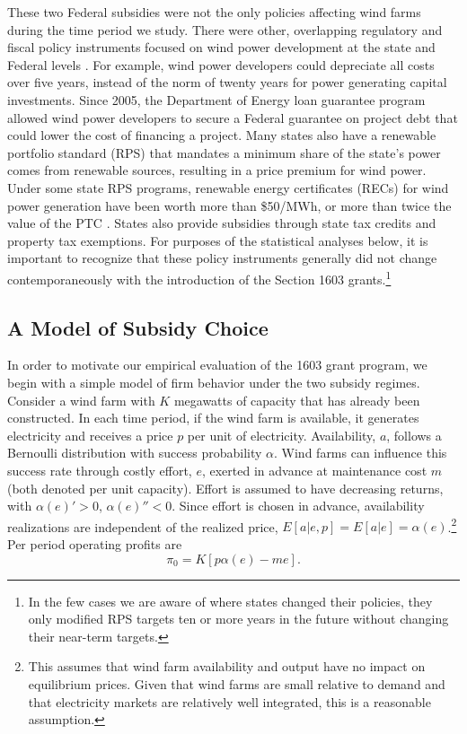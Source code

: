 \documentclass[12pt]{article}
\begin{document}
These two Federal subsidies were not the only policies affecting wind farms during the time period we study. There were other, overlapping regulatory and fiscal policy instruments focused on wind power development at the state and Federal levels \citep{aldy_preliminary_2013,metcalf_investment_2010,schmalensee_evaluating_2012}. For example, wind power developers could depreciate all costs over five years, instead of the norm of twenty years for power generating capital investments. Since 2005, the Department of Energy loan guarantee program allowed wind power developers to secure a Federal guarantee on project debt that could lower the cost of financing a project. Many states also have a renewable portfolio standard (RPS) that mandates a minimum share of the state's power comes from renewable sources, resulting in a price premium for wind power. Under some state RPS programs, renewable energy certificates (RECs) for wind power generation have been worth more than \$50/MWh, or more than twice the value of the PTC \citep{schmalensee_evaluating_2012}. States also provide subsidies through state tax credits and property tax exemptions. For purposes of the statistical analyses below, it is important to recognize that these policy instruments generally did not change contemporaneously with the introduction of the Section 1603 grants.\footnote{In the few cases we are aware of where states changed their policies, they only modified RPS targets ten or more years in the future without changing their near-term targets.}

\subsection{A Model of Subsidy Choice\label{subsec:model}}

In order to motivate our empirical evaluation of the 1603 grant program, we begin with a simple model of firm behavior under the two subsidy regimes. Consider a wind farm with $K$ megawatts of capacity that has already been constructed. In each time period, if the wind farm is available, it generates electricity and receives a price $p$ per unit of electricity. Availability, $a$, follows a Bernoulli distribution with success probability $\alpha$. Wind farms can influence this success rate through costly effort, $e$, exerted in advance at maintenance cost $m$ (both denoted per unit capacity). Effort is assumed to have decreasing returns, with $\alpha(e)'>0$, $\alpha(e)''<0$. Since effort is chosen in advance, availability realizations are independent of the realized price, $E[a|e,p]=E[a|e]=\alpha(e)$.\footnote{This assumes that wind farm availability and output have no impact on equilibrium prices. Given that wind farms are small relative to demand and that electricity markets are relatively well integrated, this is a reasonable assumption.} Per period operating profits are 
\begin{equation}
\pi_{0}=K[p\alpha(e)-me].\label{eq:capital_op_pi}
\end{equation}
\end{document}
